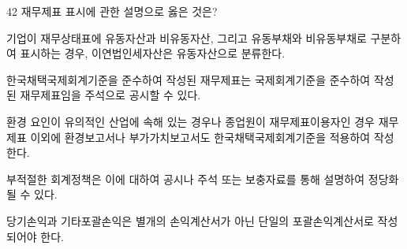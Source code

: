 \begin{question}{42}
재무제표 표시에 관한 설명으로 옳은 것은?
\begin{choices}
  \item 기업이 재무상태표에 유동자산과 비유동자산, 그리고 유동부채와 비유동부채로 구분하여 표시하는 경우, 이연법인세자산은 유동자산으로 분류한다.
  \item 한국채택국제회계기준을 준수하여 작성된 재무제표는 국제회계기준을 준수하여 작성된 재무제표임을 주석으로 공시할 수 있다.
  \item 환경 요인이 유의적인 산업에 속해 있는 경우나 종업원이 재무제표이용자인 경우 재무제표 이외에 환경보고서나 부가가치보고서도 한국채택국제회계기준을 적용하여 작성한다.
  \item 부적절한 회계정책은 이에 대하여 공시나 주석 또는 보충자료를 통해 설명하여 정당화될 수 있다.
  \item 당기손익과 기타포괄손익은 별개의 손익계산서가 아닌 단일의 포괄손익계산서로 작성되어야 한다.
\end{choices}
\end{question}
